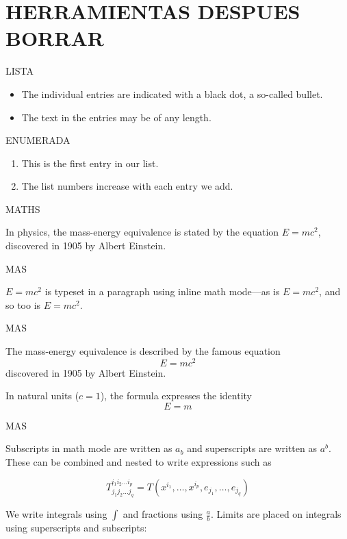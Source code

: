 \section*{HERRAMIENTAS DESPUES BORRAR}
LISTA
\begin{itemize}
  \item The individual entries are indicated with a black dot, a so-called bullet.
  \item The text in the entries may be of any length.
\end{itemize}


ENUMERADA
\begin{enumerate}
  \item This is the first entry in our list.
  \item The list numbers increase with each entry we add.
\end{enumerate}



MATHS

In physics, the mass-energy equivalence is stated 
by the equation $E=mc^2$, discovered in 1905 by Albert Einstein.


MAS

\begin{math}
E=mc^2
\end{math} is typeset in a paragraph using inline math mode---as is $E=mc^2$, and so too is \(E=mc^2\).



MAS

The mass-energy equivalence is described by the famous equation
\[ E=mc^2 \] discovered in 1905 by Albert Einstein. 

In natural units ($c = 1$), the formula expresses the identity
\begin{equation}
E=m
\end{equation}





MAS

Subscripts in math mode are written as $a_b$ and superscripts are written as $a^b$. These can be combined and nested to write expressions such as

\[ T^{i_1 i_2 \dots i_p}_{j_1 j_2 \dots j_q} = T(x^{i_1},\dots,x^{i_p},e_{j_1},\dots,e_{j_q}) \]
 
We write integrals using $\int$ and fractions using $\frac{a}{b}$. Limits are placed on integrals using superscripts and subscripts:

